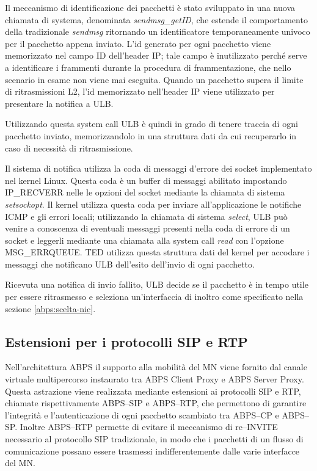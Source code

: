 \documentclass[12pt,a4paper,openright,twoside,draft]{book}
\begin{document}
Il meccanismo di identificazione dei pacchetti è stato sviluppato in
una nuova chiamata di systema, denominata \emph{sendmsg\_getID}, che
estende il comportamento della tradizionale \emph{sendmsg} ritornando
un identificatore temporaneamente univoco per il pacchetto appena
inviato. L'id generato per ogni pacchetto viene memorizzato nel campo
ID dell'header IP; tale campo è inutilizzato perché serve a
identificare i frammenti durante la procedura di frammentazione, che
nello scenario in esame non viene mai eseguita. Quando un pacchetto
supera il limite di ritrasmissioni L2, l'id memorizzato nell'header IP
viene utilizzato per presentare la notifica a ULB.

Utilizzando questa system call ULB è quindi in grado di
tenere traccia di ogni pacchetto inviato, memorizzandolo in una
struttura dati da cui recuperarlo in caso di necessità di
ritrasmissione.

Il sistema di notifica utilizza la coda di messaggi d'errore dei
socket implementato nel kernel Linux. Questa coda è un buffer di
messaggi abilitato impostando IP\_RECVERR nelle le opzioni del socket
mediante la chiamata di sistema \emph{setsockopt}. Il kernel utilizza
questa coda per inviare all'applicazione le notifiche ICMP e gli
errori locali; utilizzando la chiamata di sistema \emph{select}, ULB
può venire a conoscenza di eventuali messaggi presenti nella coda di
errore di un socket e leggerli mediante una chiamata alla system call
\emph{read} con l'opzione MSG\_ERRQUEUE. TED utilizza questa struttura
dati del kernel per accodare i messaggi che notificano ULB dell'esito
dell'invio di ogni pacchetto.

Ricevuta una notifica di invio fallito, ULB decide se il pacchetto è
in tempo utile per essere ritrasmesso e seleziona un'interfaccia di
inoltro come specificato nella sezione \ref{abps:scelta-nic}.

\subsection{Estensioni per i protocolli SIP e RTP}

Nell'architettura ABPS il supporto alla mobilità del MN viene fornito
dal canale virtuale multipercorso instaurato tra ABPS Client Proxy e
ABPS Server Proxy. Questa astrazione viene realizzata mediante
estensioni ai protocolli SIP e RTP, chiamate rispettivamente ABPS--SIP
e ABPS--RTP, che permettono di garantire l'integrità e
l'autenticazione di ogni pacchetto scambiato tra ABPS--CP e
ABPS--SP. Inoltre ABPS--RTP permette di evitare il meccanismo di
re--INVITE necessario al protocollo SIP tradizionale, in modo che i
pacchetti di un flusso di comunicazione possano essere trasmessi
indifferentemente dalle varie interfacce del MN.
\end{document}
